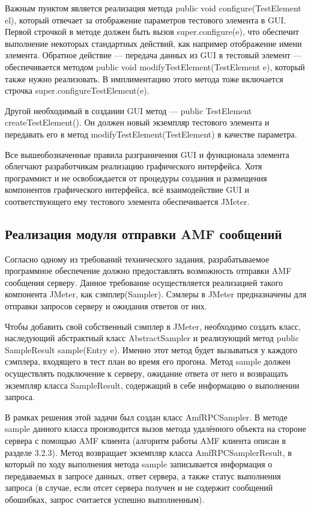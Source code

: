 Важным пунктом является реализация метода public void configure(TestElement el), который отвечает за отображение
параметров тестового элемента в GUI. Первой строчкой в методе должен быть вызов super.configure(e), что обеспечит
выполнение некоторых стандартных действий, как например отображение имени элемента. Обратное действие ---
передача данных из GUI в тестовый элемент --- обеспечивается методом public void modifyTestElement(TestElement e),
который также нужно реализовать. В имплиментацию этого метода тоже включается строчка
super.configureTestElement(e).

Другой необходимый в создании GUI метод --- public TestElement createTestElement(). Он должен новый экземпляр
тестового элемента и передавать его в метод modifyTestElement(TestElement) в качестве параметра.

Все вышеобозначенные правила разграничения GUI и функционала элемента облегчают разработчикам реализацию графического
интерфейса. Хотя программист и не освобождается от процедуры создания и размещения компонентов графического
интерфейса, всё взаимодействие GUI и соответствующего ему тестового элемента обеспечивается JMeter.

\subsection{Реализация модуля отправки AMF сообщений}

Согласно одному из требований технического задания, разрабатываемое программное обеспечение должно предоставлять возможность 
отправки AMF сообщения серверу. Данное требование осуществляется реализацией такого компонента JMeter, как сэмплер(Sampler). 
Сэмлеры в JMeter предназначены для отправки запросов серверу и ожидания ответов от них. 

Чтобы добавить свой собственный сэмплер в JMeter, необходимо создать класс, наследующий абстрактный класс AbstractSampler и 
реализующий метод public SampleResult sample(Entry e). Именно этот метод будет вызываться у каждого сэмплера, входящего в 
тест план во время его прогона. Метод sample должен осуществлять подключение к серверу, ожидание ответа от него и возвращать 
экземпляр класса SampleResult, содержащий в себе информацию о выполнении запроса.

В рамках решения этой задачи был создан класс AmfRPCSampler. В методе sample данного класса производится вызов метода 
удалённого объекта на стороне сервера с помощью AMF клиента (алгоритм работы AMF клиента описан в разделе 3.2.3). 
Метод возвращает экземпляр класса AmfRPCSamplerResult, в который по ходу выполнения метода sample записывается информация 
о передаваемых в запросе данных, ответ сервера, а также статус выполнения запроса (в случае, если отсет сервера получен и 
не содержит сообщений обошибках, запрос считается успешно выполненным).

